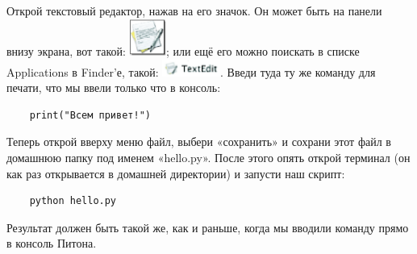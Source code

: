 \begin{MAC}
Открой текстовый редактор, нажав на его значок. Он может быть на панели внизу экрана, вот такой: \includegraphics*[width=12mm]{../en/textedit-icon.eps}; или ещё его можно поискать в списке Applications в Finder'е, такой: \includegraphics*[width=19mm]{../en/textedit-icon2.eps}. Введи туда ту же команду для печати, что мы ввели только что в консоль:

\begin{listing}
	\begin{verbatim}
	print("Всем привет!")
	\end{verbatim}
\end{listing}

Теперь открой вверху меню файл, выбери «сохранить» и сохрани этот файл в домашнюю папку под именем «hello.py». После этого опять открой терминал (он как раз открывается в домашней директории) и запусти наш скрипт:

\begin{listing}
	\begin{verbatim}
	python hello.py
	\end{verbatim}
\end{listing}

Результат должен быть такой же, как и раньше, когда мы вводили команду прямо в консоль Питона.
\end{MAC}

